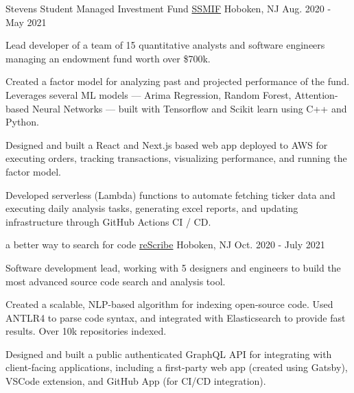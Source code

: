 

\begin{cventries}

  \cventry
  {Stevens Student Managed Investment Fund} %
  {\href{https://bailey.ssmif.com}{SSMIF}} %
  {Hoboken, NJ} %
  {Aug. 2020 - May 2021} %
  {
    \begin{cvitems} %
      \item {Lead developer of a team of 15 quantitative analysts and software engineers managing an endowment fund worth over \$700k.}
      \item {Created a factor model for analyzing past and projected performance of the fund. Leverages several ML models --- Arima Regression, Random Forest, Attention-based Neural Networks --- built with Tensorflow and Scikit learn using C++ and Python.}
      \item {Designed and built a React and Next.js based web app deployed to AWS for executing orders, tracking transactions, visualizing performance, and running the factor model.}
      \item {Developed serverless (Lambda) functions to automate fetching ticker data and executing daily analysis tasks, generating excel reports, and updating infrastructure through GitHub Actions CI / CD.}
    \end{cvitems}
  }

  \cventry
  {a better way to search for code} %
  {\href{https://rescribe.dev}{reScribe}} %
  {Hoboken, NJ} %
  {Oct. 2020 - July 2021} %
  {
    \begin{cvitems} %
      \item {Software development lead, working with 5 designers and engineers to build the most advanced source code search and analysis tool.}
      \item {Created a scalable, NLP-based algorithm for indexing open-source code. Used ANTLR4 to parse code syntax, and integrated with Elasticsearch to provide fast results. Over 10k repositories indexed.}
      \item {Designed and built a public authenticated GraphQL API for integrating with client-facing applications, including a first-party web app (created using Gatsby), VSCode extension, and GitHub App (for CI/CD integration).}
    \end{cvitems}
  }


\end{cventries}
